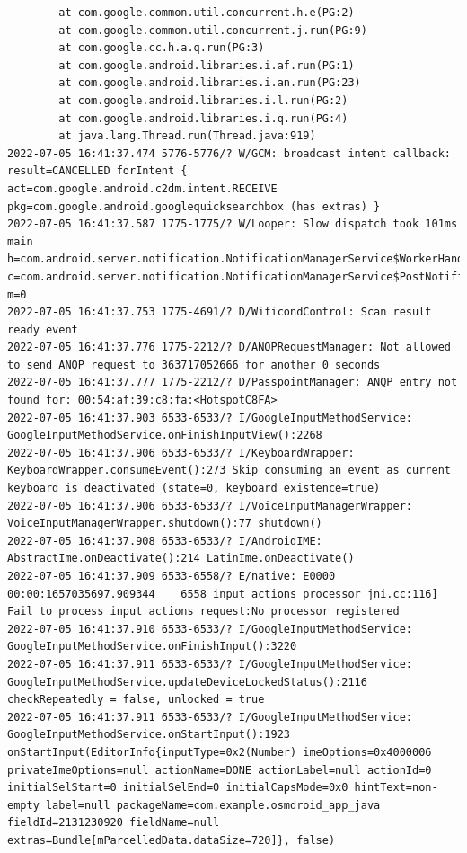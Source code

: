 \documentclass[a4paper,12pt]{book}
\begin{document}
\begin{lstlisting}
        at com.google.common.util.concurrent.h.e(PG:2)
        at com.google.common.util.concurrent.j.run(PG:9)
        at com.google.cc.h.a.q.run(PG:3)
        at com.google.android.libraries.i.af.run(PG:1)
        at com.google.android.libraries.i.an.run(PG:23)
        at com.google.android.libraries.i.l.run(PG:2)
        at com.google.android.libraries.i.q.run(PG:4)
        at java.lang.Thread.run(Thread.java:919)
2022-07-05 16:41:37.474 5776-5776/? W/GCM: broadcast intent callback: result=CANCELLED forIntent { act=com.google.android.c2dm.intent.RECEIVE pkg=com.google.android.googlequicksearchbox (has extras) }
2022-07-05 16:41:37.587 1775-1775/? W/Looper: Slow dispatch took 101ms main h=com.android.server.notification.NotificationManagerService$WorkerHandler c=com.android.server.notification.NotificationManagerService$PostNotificationRunnable@3621fdc m=0
2022-07-05 16:41:37.753 1775-4691/? D/WificondControl: Scan result ready event
2022-07-05 16:41:37.776 1775-2212/? D/ANQPRequestManager: Not allowed to send ANQP request to 363717052666 for another 0 seconds
2022-07-05 16:41:37.777 1775-2212/? D/PasspointManager: ANQP entry not found for: 00:54:af:39:c8:fa:<HotspotC8FA>
2022-07-05 16:41:37.903 6533-6533/? I/GoogleInputMethodService: GoogleInputMethodService.onFinishInputView():2268 
2022-07-05 16:41:37.906 6533-6533/? I/KeyboardWrapper: KeyboardWrapper.consumeEvent():273 Skip consuming an event as current keyboard is deactivated (state=0, keyboard existence=true)
2022-07-05 16:41:37.906 6533-6533/? I/VoiceInputManagerWrapper: VoiceInputManagerWrapper.shutdown():77 shutdown()
2022-07-05 16:41:37.908 6533-6533/? I/AndroidIME: AbstractIme.onDeactivate():214 LatinIme.onDeactivate()
2022-07-05 16:41:37.909 6533-6558/? E/native: E0000 00:00:1657035697.909344    6558 input_actions_processor_jni.cc:116] Fail to process input actions request:No processor registered
2022-07-05 16:41:37.910 6533-6533/? I/GoogleInputMethodService: GoogleInputMethodService.onFinishInput():3220 
2022-07-05 16:41:37.911 6533-6533/? I/GoogleInputMethodService: GoogleInputMethodService.updateDeviceLockedStatus():2116 checkRepeatedly = false, unlocked = true
2022-07-05 16:41:37.911 6533-6533/? I/GoogleInputMethodService: GoogleInputMethodService.onStartInput():1923 onStartInput(EditorInfo{inputType=0x2(Number) imeOptions=0x4000006 privateImeOptions=null actionName=DONE actionLabel=null actionId=0 initialSelStart=0 initialSelEnd=0 initialCapsMode=0x0 hintText=non-empty label=null packageName=com.example.osmdroid_app_java fieldId=2131230920 fieldName=null extras=Bundle[mParcelledData.dataSize=720]}, false)

\end{lstlisting}
\end{document}
